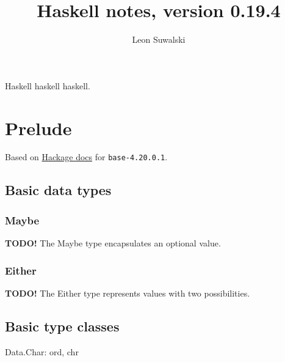 \documentclass{charun}
\title{Haskell notes, version 0.19.4}
\author{Leon Suwalski}
\begin{document}
\begin{multicols*}{3}
\maketitle
\raggedright
Haskell haskell haskell.
\section{Prelude}
Based on \href{https://hackage.haskell.org/package/base-4.20.0.1/docs/Prelude.html}{Hackage docs} for \texttt{base-4.20.0.1}.

\subsection{Basic data types}






\subsubsection{Maybe}
\textbf{TODO!}
The Maybe type encapsulates an optional value.

\subsubsection{Either}
\textbf{TODO!}
The Either type represents values with two possibilities.





\subsection{Basic type classes}











\newpage








Data.Char: ord, chr


\end{multicols*}
\end{document}
